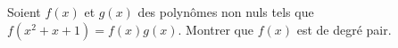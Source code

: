 Soient $f(x)$ et $g(x)$ des polynômes non nuls tels que $f(x^2 + x + 1) = f(x)g(x)$. Montrer que $f(x)$ est de degré pair.
